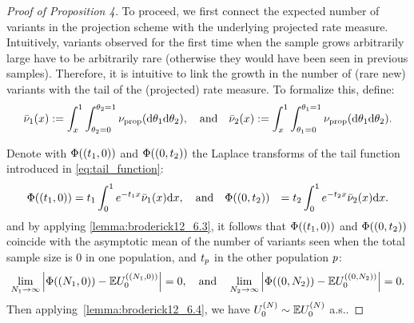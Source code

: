 \begin{proof}[Proof of Proposition 4]
To proceed, we first connect the expected number of variants in the projection scheme with the underlying projected rate measure. 
Intuitively, variants observed for the first time when the sample grows arbitrarily large have to be arbitrarily rare (otherwise they would have been seen in previous samples). 
Therefore, it is intuitive to link the growth in the number of (rare new) variants with the tail of the (projected) rate measure. To formalize this, define:
\begin{align}
\begin{split}
    \bar{\nu}_{1}(x) := \int_x^1\int_{\theta_{2} = 0}^{\theta_{2} = 1}\nu_{\mathrm{prop}}( \mathrm{d}\theta_{1}\mathrm{d} \theta_{2}), \quad \text{and} \quad
    \bar{\nu}_{2}(x) := \int_x^1\int_{\theta_{1}=0}^{\theta_{1}=1}\nu_{\mathrm{prop}}( \mathrm{d}\theta_{1}\mathrm{d} \theta_{2}).
\end{split} \label{eq:tail_function}
\end{align}

Denote with $\Phi((t_1,0))$ and $\Phi((0,t_2))$ 
the Laplace transforms of the tail function introduced in \cref{eq:tail_function}:
\begin{equation}
    \label{eq:laplace}
    \begin{aligned}
        \Phi((t_1,0))&=t_1\int_{0}^1 e^{-t_1x} \bar{\nu}_{1}(x)\mathrm{d} x, \quad \text{and} \quad
        \Phi((0,t_2))&=t_2\int_{0}^1 e^{-t_2x} \bar{\nu}_{2}(x) \mathrm{d} x.
    \end{aligned}
\end{equation}
 and by applying \cref{lemma:broderick12_6.3}, it follows that $\Phi((t_1,0))$ and $\Phi((0,t_2))$ coincide with the asymptotic mean of the number of variants seen when the total sample size is $0$ in one population, and $t_p$ in the other population $p$:
\begin{equation}
    \label{eq:poissonized_error}
        \lim_{N_1 \to \infty} \left|\poissonize((N_1,0))-\E \news{\zerovec}{(N_1,0)} \right| =  0,\quad\text{and}\quad
         \lim_{N_2 \to \infty} \left|\poissonize((0,N_2))-\E \news{\zerovec}{(0, N_2)} \right| =  0.
\end{equation}
Then applying~\cref{lemma:broderick12_6.4}, we have $ \news{\zerovec}{\vecsamplesize} \sim \E \news{\zerovec}{\vecsamplesize}$ a.s..




\end{proof}
